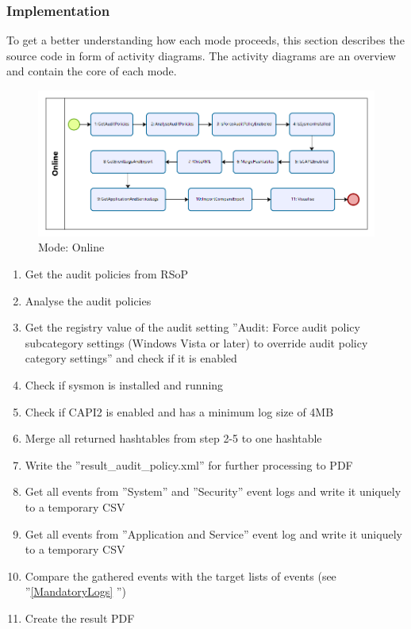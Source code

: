 \subsubsection{Implementation}
To get a better understanding how each mode proceeds, this section describes the source code in form of activity diagrams. The activity diagrams are an overview and contain the core of each mode.
\begin{figure}[H]
    \centering
    \includegraphics[width=1\linewidth]{assets/modes/online.png}
    \caption{Mode: Online}
\end{figure}
\begin{enumerate}
    \item Get the audit policies from RSoP
    \item Analyse the audit policies
    \item Get the registry value of the audit setting ''Audit: Force audit policy subcategory settings (Windows Vista or later) to override audit policy category settings'' and check if it is enabled
    \item Check if sysmon is installed and running
    \item Check if CAPI2 is enabled and has a minimum log size of 4MB
    \item Merge all returned hashtables from step 2-5 to one hashtable
    \item Write the ''result\_audit\_policy.xml'' for further processing to PDF
    \item Get all events from ''System'' and ''Security'' event logs and write it uniquely to a temporary CSV
    \item Get all events from ''Application and Service'' event log and write it uniquely to a temporary CSV
    \item Compare the gathered events with the target lists of events (see ''\ref{MandatoryLogs} '')
    \item Create the result PDF
\end{enumerate}

